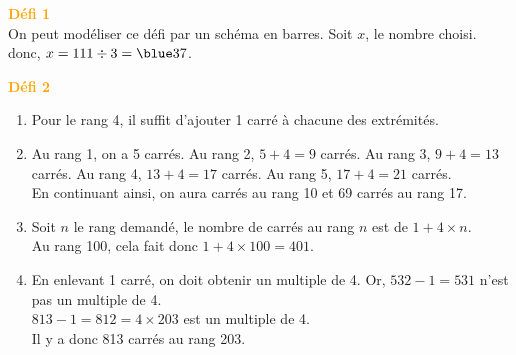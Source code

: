 \hspace*{-7.5mm} \textcolor{orange}{\bf Défi 1} \\
   On peut modéliser ce défi par un schéma en barres. Soit $x$, le nombre choisi. \\
    donc, $x =111\div3 ={\blue 37}$.

\hspace*{-7.5mm} \textcolor{orange}{\bf Défi 2} \\
   \begin{enumerate}
      \item Pour le rang 4, il suffit {\blue d'ajouter 1 carré à chacune des extrémités}.
      \item Au rang 1, on a 5 carrés. Au rang 2, $5+4 =9$ carrés. Au rang 3, $9+4 =13$ carrés.  Au rang 4, $13+4 =17$ carrés. {\blue Au rang 5, $17+4 =21$ carrés}. \\
         En continuant ainsi, on aura { carrés au rang 10 et 69 carrés au rang 17}.
         \item Soit $n$ le rang demandé, {\blue le nombre de carrés au rang $n$ est de $1+4\times n$}. \\
            Au rang 100, cela fait donc $1+4\times100 =401$.
         \item En enlevant 1 carré, on doit obtenir un multiple de 4. Or, $532-1 =531$ n'est pas un multiple de 4. \\
            $813-1 =812 =4\times203$ est un multiple de 4. \\
            {\blue Il y a donc 813 carrés au rang 203}.
   \end{enumerate}
